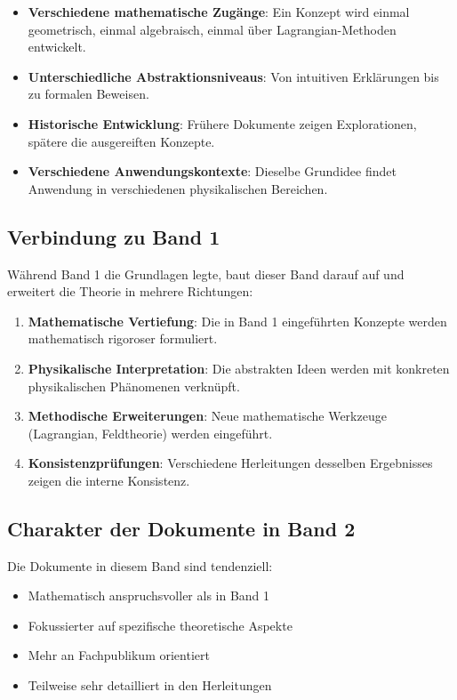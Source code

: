 \begin{itemize}
\item \textbf{Verschiedene mathematische Zugänge}: Ein Konzept wird einmal geometrisch, einmal algebraisch, einmal über Lagrangian-Methoden entwickelt.

\item \textbf{Unterschiedliche Abstraktionsniveaus}: Von intuitiven Erklärungen bis zu formalen Beweisen.

\item \textbf{Historische Entwicklung}: Frühere Dokumente zeigen Explorationen, spätere die ausgereiften Konzepte.

\item \textbf{Verschiedene Anwendungskontexte}: Dieselbe Grundidee findet Anwendung in verschiedenen physikalischen Bereichen.
\end{itemize}

\subsection*{Verbindung zu Band 1}

Während Band 1 die Grundlagen legte, baut dieser Band darauf auf und erweitert die Theorie in mehrere Richtungen:

\begin{enumerate}
\item \textbf{Mathematische Vertiefung}: Die in Band 1 eingeführten Konzepte werden mathematisch rigoroser formuliert.

\item \textbf{Physikalische Interpretation}: Die abstrakten Ideen werden mit konkreten physikalischen Phänomenen verknüpft.

\item \textbf{Methodische Erweiterungen}: Neue mathematische Werkzeuge (Lagrangian, Feldtheorie) werden eingeführt.

\item \textbf{Konsistenzprüfungen}: Verschiedene Herleitungen desselben Ergebnisses zeigen die interne Konsistenz.
\end{enumerate}

\subsection*{Charakter der Dokumente in Band 2}

Die Dokumente in diesem Band sind tendenziell:

\begin{itemize}
\item Mathematisch anspruchsvoller als in Band 1
\item Fokussierter auf spezifische theoretische Aspekte
\item Mehr an Fachpublikum orientiert
\item Teilweise sehr detailliert in den Herleitungen
\end{itemize}

